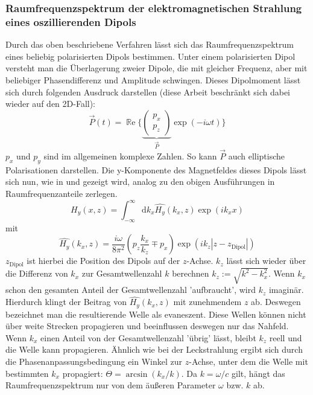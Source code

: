 \documentclass[titlepage]{article}
\renewcommand{\Re}{\operatorname{\mathbb{R}e}}
\begin{document}
	\subsubsection{Raumfrequenzspektrum der elektromagnetischen Strahlung eines oszillierenden Dipols}
	\label{sec:spatial_freq_dip}
	Durch das oben beschriebene Verfahren lässt sich das Raumfrequenzspektrum eines beliebig polarisierten Dipols bestimmen. Unter einem polarisierten Dipol versteht man die Überlagerung zweier Dipole, die mit gleicher Frequenz, aber mit beliebiger Phasendifferenz und Amplitude schwingen. Dieses Dipolmoment lässt sich durch folgenden Ausdruck darstellen (diese Arbeit beschränkt sich dabei wieder auf den 2D-Fall): 
	$$\vec{P}(t)= \Re\biggl\{\underbrace{\begin{pmatrix} p_x \\ p_z \end{pmatrix}}_{\vec{P}} \exp(-i\omega t)\biggr\} $$
	$p_x$ und $p_y$ sind im allgemeinen komplexe Zahlen. So kann $\vec{P}$ auch elliptische Polarisationen darstellen. Die y-Komponente des Magnetfeldes dieses Dipols lässt sich nun, wie in \cite{Novotny.2012b} und \cite{RodriguezFortuno.2013} gezeigt wird, analog zu den obigen Ausführungen in Raumfrequenzanteile zerlegen.
	\begin{equation}
		H_y(x, z) = \int_{-\infty}^{\infty}\mathrm{d}k_x\hat{H_y}(k_x, z)\exp(ik _xx) 
	\end{equation}
	mit
	\begin{equation}
		\label{eq:spatial_freq_dip}
		\boxed{\hat{H_y}(k_x, z) = \dfrac{i\omega}{8\pi^2}\left(p_z\dfrac{k_x}{k_z} \mp p_x\right)\exp(ik_z|z-z_{\mathrm{Dipol}}|)}
	\end{equation}
	$z_{\mathrm{Dipol}}$ ist hierbei die Position des Dipols auf der $z$-Achse. $k_z$ lässt sich wieder über die Differenz von $k_x$ zur Gesamtwellenzahl $k$ berechnen $k_z := \sqrt{k^2-k_x^2}$. Wenn $k_x$ schon den gesamten Anteil der Gesamtwellenzahl 'aufbraucht',  wird $k_z$ imaginär. Hierdurch klingt der Beitrag von $\hat{H_y}(k_x, z)$ mit zunehmendem $z$ ab. Deswegen bezeichnet man die resultierende Welle als evaneszent. Diese Wellen können nicht über weite Strecken propagieren und beeinflussen deswegen nur das Nahfeld. Wenn $k_x$ einen Anteil von der Gesamtwellenzahl 'übrig' lässt, bleibt $k_z$ reell und die Welle kann propagieren. Ähnlich wie bei der Leckstrahlung ergibt sich durch die Phasenanpassungsbedingung ein Winkel zur $z$-Achse, unter dem die Welle mit bestimmten $k_x$ propagiert: $\Theta = \arcsin(k_x/k)$. Da $k = \omega / c$ gilt, hängt das Raumfrequenzspektrum nur von dem äußeren Parameter $\omega$ bzw. $k$ ab. 
\end{document}
